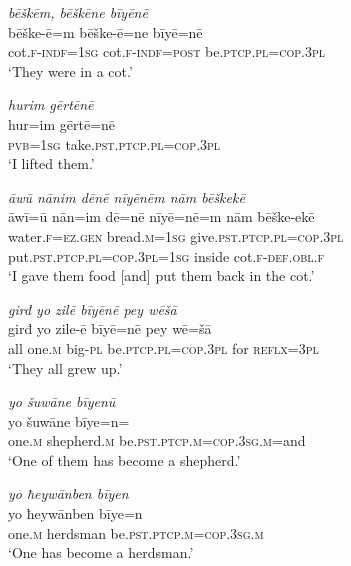\ea \label{ŽE.65}
\textit{bēškēm, bēškēne bīyēnē} \\ 
\gll bēške-ē=m bēške-ē=ne bīyē=nē \\ 
 cot\textsc{.f}\textsc{-indf}\textsc{=\textsc{1sg}} cot\textsc{.f}\textsc{-indf}\textsc{=\textsc{post}} be\textsc{.ptcp}\textsc{.pl}\textsc{=cop}\textsc{.3pl} \\ 
\glt `They were in a cot.'
\z 
 
\ea \label{ŽE.66}
\textit{hurim gērtēnē} \\ 
\gll hur=im gērtē=nē \\ 
 \textsc{pvb}\textsc{=\textsc{1sg}} take\textsc{.pst}\textsc{.ptcp}\textsc{.pl}\textsc{=cop}\textsc{.3pl} \\ 
\glt `I lifted them.'
\z 
 
\ea \label{ŽE.67}
\textit{āwū nānim dēnē nīyēnēm nām bēškekē} \\ 
\gll āwī=ū nān=im dē=nē nīyē=nē=m nām bēške-ekē \\ 
 water\textsc{.f}\textsc{\textsc{=ez.gen}} bread\textsc{.m}\textsc{=\textsc{1sg}} give\textsc{.pst}\textsc{.ptcp}\textsc{.pl}\textsc{=cop}\textsc{.3pl} put\textsc{.pst}\textsc{.ptcp}\textsc{.pl}\textsc{=cop}\textsc{.3pl}\textsc{=\textsc{1sg}} inside cot\textsc{.f}\textsc{-def}\textsc{.obl}\textsc{.f} \\ 
\glt `I gave them food [and] put them back in the cot.'
\z 
 
\ea \label{ŽE.68}
\textit{girđ yo zilē bīyēnē pey wēšā} \\ 
\gll girđ yo zile-ē bīyē=nē pey wē=šā \\ 
 all one\textsc{.m} big\textsc{\textsc{-pl}} be\textsc{.ptcp}\textsc{.pl}\textsc{=cop}\textsc{.3pl} for \textsc{reflx}\textsc{=3pl} \\ 
\glt `They all grew up.'
\z 
 
\ea \label{ŽE.69}
\textit{yo šuwāne bīyenū} \\ 
\gll yo šuwāne bīye=n=\\ 
 one\textsc{.m} shepherd\textsc{.m} be\textsc{.pst}\textsc{.ptcp}\textsc{.m}\textsc{=cop}\textsc{.3sg}\textsc{.m}=and \\ 
\glt `One of them has become a shepherd.'
\z 
 
\ea \label{ŽE.70}
\textit{yo ħeywānben bīyen} \\ 
\gll yo ħeywānben bīye=n \\ 
 one\textsc{.m} herdsman be\textsc{.pst}\textsc{.ptcp}\textsc{.m}\textsc{=cop}\textsc{.3sg}\textsc{.m} \\ 
\glt `One has become a herdsman.'
\z 
 
